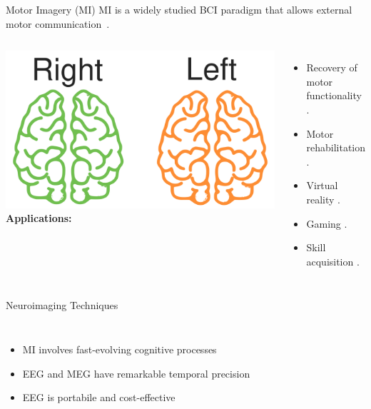 \documentclass[aspectratio=169]{beamer}
\let\oldcite\cite %
\renewcommand{\cite}[1]{{\tiny\oldcite{#1}}}
\begin{document}
\begin{frame}{Motor Imagery (MI)}
    \centering
    MI is a widely studied BCI paradigm that allows external motor communication~\cite{cattan2018recommendations}.
    \vspace{3em}
    \begin{columns}
        \centering
        \includegraphics[width=0.7\linewidth]{figures/Motor_imagery.png}
            \textbf{Applications:}
            \begin{itemize}
                \item Recovery of motor functionality \cite{bonci2021introductory}.
                \item Motor rehabilitation \cite{sitaram2017closed}.
                \item Virtual reality  \cite{cattan2018recommendations}.
                \item Gaming \cite{ahn2014review}.
                \item Skill acquisition \cite{casimo2017bci}.
            \end{itemize}
    \end{columns}
\end{frame}

\begin{frame}{Neuroimaging Techniques}
    \begin{columns}
            \begin{itemize}
                \item MI involves fast-evolving cognitive processes \cite{varbu2022past}
                \item EEG and MEG have remarkable temporal precision \cite{alsharif2020neuromarketing}
                \item EEG is portabile and cost-effective \cite{janapati2023advances, hosseini2020review}
            \end{itemize}
            \begin{figure}[h!]
                \centering
                \resizebox{1\linewidth}{!}{}
            \end{figure}
    \end{columns}
\end{frame}
\end{document}
